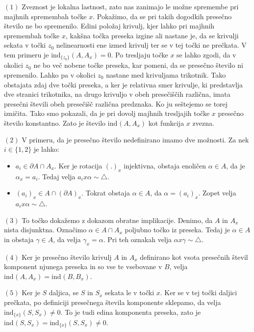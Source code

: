 \documentclass[mat1]{fmfdelo}
\newcommand{\ind}[3][]{\text{ind}_{#1}(#2, #3)}
\begin{document}
$(1)$ Zveznost je lokalna lastnost, zato nas zanimajo le možne spremembe pri majhnih spremembah točke $x$. Pokažimo, da se pri takih dogodkih presečno število ne bo spremenilo. Edini položaj krivulj, kjer lahko pri majhnih spremembah točke $x$, kakšna točka preseka izgine ali nastane je, da se krivulji sekata v točki $z_0$ nelinearnosti ene izmed krivulj ter se v tej točki ne prečkata. V tem primeru je $\ind[\{z_0\}]{A}{A_x}=0$. Po tresljaju točke $x$ se lahko zgodi, da v okolici $z_0$ ne bo več nobene točke preseka, kar pomeni, da se presečno število ni spremenilo. Lahko pa v okolici $z_0$ nastane med krivuljama trikotnik. Tako obstajata zdaj dve točki preseka, a ker je relativna smer krivulje, ki predstavlja dve stranici trikotnika, na drugo krivuljo v obeh presečiščih različna, imata presečni števili obeh presečišč različna predznaka. Ko ju seštejemo se torej izničita. Tako smo pokazali, da je pri dovolj majhnih tresljajih točke $x$ presečno število konstantno. Zato je število $\ind{A}{A_x}$ kot funkcija $x$ zvezna.

$(2)$ V primeru, da je presečno število nedefinirano imamo dve možnosti. Za nek $i \in \{1, 2\}$ je lahko: 
\begin{itemize}
\item $a_i \in  \partial A \cap A_x$. Ker je rotacija $(.)_x$ injektivna, obstaja enoličen $\alpha \in A$, da je $\alpha_x = a_i$. Tedaj velja $a_ix\alpha \sim \triangle$.
\item $(a_i)_x \in A \cap (\partial A)_x$. Tokrat obstaja $\alpha \in A$, da $\alpha = (a_i)_x$. Zopet velja $a_ix\alpha \sim \triangle$.
\end{itemize}

$(3)$ To točko dokažemo z dokazom obratne implikacije. Denimo, da $A$ in $A_x$ nista disjunktna. Označimo $\alpha \in A \cap A_x$ poljubno točko iz preseka. Tedaj je $\alpha \in A$ in obstaja $\gamma \in A$, da velja $\gamma_x = \alpha$. Pri teh oznakah velja $\alpha x \gamma \sim \triangle$.

$(4)$ Ker je presečno število krivulj $A$ in $A_x$ definirano kot vsota presečnih števil komponent njunega preseka in so vse te vsebovane v $B$, velja $\ind{A}{A_x} = \ind{B}{B_x}$.

$(5)$ Ker je $S$ daljica, se $S$ in $S_x$ sekata le v točki $x$. Ker se v tej točki daljici prečkata, po definiciji presečnega števila komponente sklepamo, da velja $\ind[\{x\}]{S}{S_x} \neq 0$. To je tudi edina komponenta preseka, zato je $\ind{S}{S_x} = \ind[\{x\}]{S}{S_x} \neq 0$.
\endproof
\end{document}
